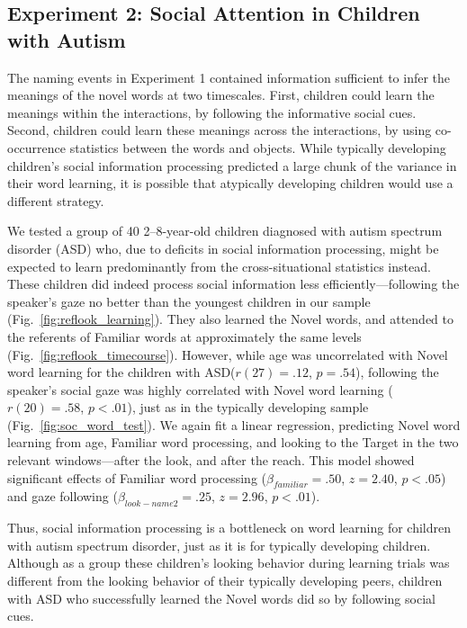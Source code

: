 \documentclass{pnastwo}
\begin{document}
\begin{article}
\section{Experiment 2: Social Attention in Children with Autism}

The naming events in Experiment 1 contained information sufficient to infer the meanings of the novel words at two timescales. First, children could learn the meanings within the interactions, by following the informative social cues. Second, children could learn these meanings  across the interactions, by using co-occurrence statistics between the words and objects. While typically developing children's social information processing predicted a large chunk of the variance in their word learning, it is possible that atypically developing children would use a different strategy.

We tested a group of 40 2--8-year-old children diagnosed with autism spectrum disorder (ASD) who, due to deficits in social information processing, might be expected to learn predominantly from the cross-situational statistics instead. These children did indeed process social information less efficiently---following the speaker's gaze no better than the youngest children in our sample (Fig.~\ref{fig:reflook_learning}). They also learned the Novel words, and attended to the referents of Familiar words at approximately the same levels (Fig.~\ref{fig:reflook_timecourse}). However, while age was uncorrelated with Novel word learning for the children with ASD($r(27) = .12$, $p =.54$), following the speaker's social gaze was highly correlated with Novel word learning ($r(20) = .58$, $p <.01$), just as in the typically developing sample (Fig.~\ref{fig:soc_word_test}). We again fit a linear regression, predicting Novel word learning from age, Familiar word processing, and looking to the Target in the two relevant windows---after the look, and after the reach. This model showed significant effects of Familiar word processing ($\beta_{familiar} = .50$, $z = 2.40$, $p < . 05$) and gaze following  ($\beta_{look-name2} = .25$, $z = 2.96$, $p < .01$).

Thus, social information processing is a bottleneck on word learning for children with autism spectrum disorder, just as it is for typically developing children. Although as a group these children's looking behavior during learning trials was different from the looking behavior of their typically developing peers, children with ASD who successfully learned the Novel words did so by following social cues.


\end{article}
\end{document}
